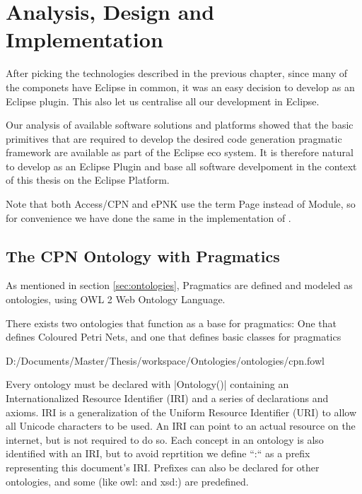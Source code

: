 \chapter{Analysis, Design and Implementation}
\label{chap:analysis}


After picking the technologies described in the previous chapter, since many of
the componets have Eclipse in common, it was an easy decision to develop
\thename{} as an Eclipse plugin. This also let us centralise all our development
in Eclipse.

Our analysis of available software solutions and platforms showed that the basic
primitives that are required to develop the desired code generation pragmatic
framework are available as part of the Eclipse eco system. It is therefore
natural to develop \thename{} as an Eclipse Plugin and base all software
develpoment in the context of this thesis on the Eclipse Platform.

Note that both Access/CPN and ePNK use the term Page instead of Module, so for
convenience we have done the same in the implementation of \thename{}.

\section{The CPN Ontology with Pragmatics}

As mentioned in section \ref{sec:ontologies}, Pragmatics are defined and modeled
as ontologies, using OWL 2 Web Ontology Language.  

There exists two ontologies that function as a base for pragmatics: One that
defines Coloured Petri Nets, and one that defines basic classes for pragmatics


{D:/Documents/Master/Thesis/workspace/Ontologies/ontologies/cpn.fowl}


Every ontology must be declared with |Ontology()| containing an
Internationalized Resource Identifier (IRI) and a series of declarations and
axioms. IRI is a generalization of the Uniform Resource Identifier (URI) to
allow all Unicode characters to be used. An IRI can point to an actual resource
on the internet, but is not required to do so. Each concept in an ontology is
also identified with an IRI, but to avoid reprtition we define ``:`` as a prefix
representing this document's IRI. Prefixes can also be declared for other
ontologies, and some (like owl: and xsd:) are predefined.

